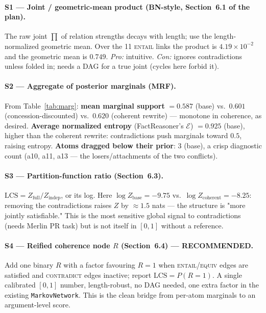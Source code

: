 \documentclass[11pt]{article}
\begin{document}
\paragraph{S1 --- Joint / geometric-mean product (BN-style, Section~6.1 of the plan).}
The raw joint $\prod$ of relation strengths decays with length; use the length-normalized
geometric mean. Over the 11 \textsc{entail} links the product is $4.19\times10^{-2}$ and the
geometric mean is $\mathbf{0.749}$. \emph{Pro:} intuitive. \emph{Con:} ignores
contradictions unless folded in; needs a DAG for a true joint (cycles here forbid it).

\paragraph{S2 --- Aggregate of posterior marginals (MRF).}
From Table~\ref{tab:marg}: \textbf{mean marginal support} $=0.587$ (base) vs.\ $0.601$
(concession-discounted) vs.\ $0.620$ (coherent rewrite) --- monotone in coherence, as
desired. \textbf{Average normalized entropy} (FactReasoner's $\mathcal E$) $=0.925$ (base),
higher than the coherent rewrite: contradictions push marginals toward $0.5$, raising
entropy. \textbf{Atoms dragged below their prior}: $3$ (base), a crisp diagnostic count
(a10, a11, a13 --- the losers/attachments of the two conflicts).

\paragraph{S3 --- Partition-function ratio (Section~6.3).}
$\mathrm{LCS}=Z_{\text{full}}/Z_{\text{indep}}$, or its log. Here
$\log Z_{\text{base}}=-9.75$ vs.\ $\log Z_{\text{coherent}}=-8.25$: removing the
contradictions raises $Z$ by $\approx\!1.5$ nats --- the structure is "more jointly
satisfiable." This is the most sensitive global signal to contradictions (needs Merlin PR
task) but is not itself in $[0,1]$ without a reference.

\paragraph{S4 --- Reified coherence node $R$ (Section~6.4) --- RECOMMENDED.}
Add one binary $R$ with a factor favouring $R{=}1$ when \textsc{entail}/\textsc{equiv} edges
are satisfied and \textsc{contradict} edges inactive; report $\mathrm{LCS}=P(R{=}1)$. A
single calibrated $[0,1]$ number, length-robust, no DAG needed, one extra factor in the
existing \texttt{MarkovNetwork}. This is the clean bridge from per-atom marginals to an
argument-level score.
\end{document}
